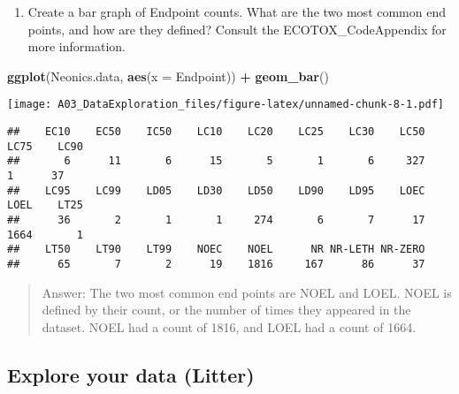 \documentclass[]{article}
\newenvironment{Shaded}{\begin{snugshade}}{\end{snugshade}}
\newcommand{\DataTypeTok}[1]{\textcolor[rgb]{0.13,0.29,0.53}{#1}}
\newcommand{\KeywordTok}[1]{\textcolor[rgb]{0.13,0.29,0.53}{\textbf{#1}}}
\newcommand{\NormalTok}[1]{#1}
\newcommand{\OperatorTok}[1]{\textcolor[rgb]{0.81,0.36,0.00}{\textbf{#1}}}
\newcommand{\StringTok}[1]{\textcolor[rgb]{0.31,0.60,0.02}{#1}}
\providecommand{\tightlist}{%
  \setlength{\itemsep}{0pt}\setlength{\parskip}{0pt}}
\begin{document}
\begin{enumerate}
\def\labelenumi{\arabic{enumi}.}
\setcounter{enumi}{10}
\tightlist
\item
  Create a bar graph of Endpoint counts. What are the two most common
  end points, and how are they defined? Consult the ECOTOX\_CodeAppendix
  for more information.
\end{enumerate}

\begin{Shaded}
\begin{Highlighting}[]
\KeywordTok{ggplot}\NormalTok{(Neonics.data, }\KeywordTok{aes}\NormalTok{(}\DataTypeTok{x =}\NormalTok{ Endpoint)) }\OperatorTok{+}
\StringTok{  }\KeywordTok{geom_bar}\NormalTok{()}
\end{Highlighting}
\end{Shaded}

\texttt{[image: A03\_DataExploration\_files/figure-latex/unnamed-chunk-8-1.pdf]}

\begin{Shaded}
\end{Shaded}

\begin{verbatim}
##    EC10    EC50    IC50    LC10    LC20    LC25    LC30    LC50    LC75    LC90 
##       6      11       6      15       5       1       6     327       1      37 
##    LC95    LC99    LD05    LD30    LD50    LD90    LD95    LOEC    LOEL    LT25 
##      36       2       1       1     274       6       7      17    1664       1 
##    LT50    LT90    LT99    NOEC    NOEL      NR NR-LETH NR-ZERO 
##      65       7       2      19    1816     167      86      37
\end{verbatim}

\begin{quote}
Answer: The two most common end points are NOEL and LOEL. NOEL is
defined by their count, or the number of times they appeared in the
dataset. NOEL had a count of 1816, and LOEL had a count of 1664.
\end{quote}

\hypertarget{explore-your-data-litter}{%
\subsection{Explore your data (Litter)}\label{explore-your-data-litter}}
\end{document}
